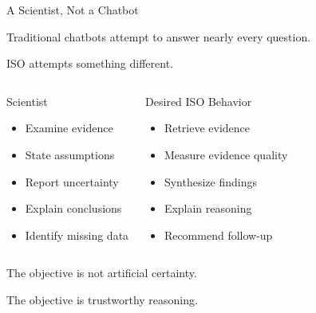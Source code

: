 \documentclass[aspectratio=169]{beamer}
\begin{document}
\begin{frame}{A Scientist, Not a Chatbot}

Traditional chatbots attempt to answer nearly every question.

\vspace{0.3cm}

ISO attempts something different.

\vspace{0.3cm}

\begin{columns}[T]


\begin{block}{Scientist}

\begin{itemize}
\item Examine evidence
\item State assumptions
\item Report uncertainty
\item Explain conclusions
\item Identify missing data
\end{itemize}

\end{block}


\begin{block}{Desired ISO Behavior}

\begin{itemize}
\item Retrieve evidence
\item Measure evidence quality
\item Synthesize findings
\item Explain reasoning
\item Recommend follow-up
\end{itemize}

\end{block}

\end{columns}

\vspace{0.3cm}

\begin{center}
\Large

The objective is not artificial certainty.

The objective is trustworthy reasoning.

\end{center}

\end{frame}
\end{document}
